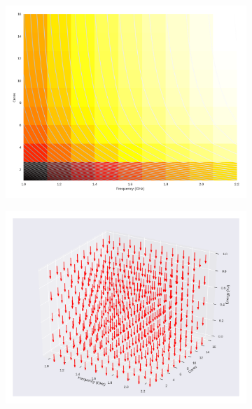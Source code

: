 \begin{figure}[H]

	\centering

	\begin{subfigure}[b]{0.45\textwidth}

		\includegraphics[width=\textwidth]{models/figures/analisys/pstatic3000.png}

	\end{subfigure}


	\begin{subfigure}[b]{0.45\textwidth}

		\includegraphics[width=\textwidth]{models/figures/analisys/pstatic3000_3d.png}

	\end{subfigure}

\end{figure}


